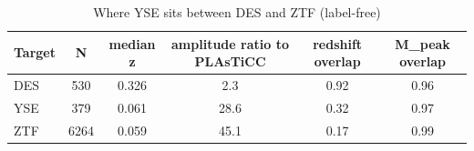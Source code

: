 \begin{table}
\centering
\caption{Where YSE sits between DES and ZTF (label-free)}
\begin{tabular}{lccccc}
\hline
Target & N & median z & amplitude ratio to PLAsTiCC & redshift overlap & M\_peak overlap \\
\hline
DES & 530 & 0.326 & 2.3 & 0.92 & 0.96 \\
YSE & 379 & 0.061 & 28.6 & 0.32 & 0.97 \\
ZTF & 6264 & 0.059 & 45.1 & 0.17 & 0.99 \\
\hline
\end{tabular}
\end{table}
